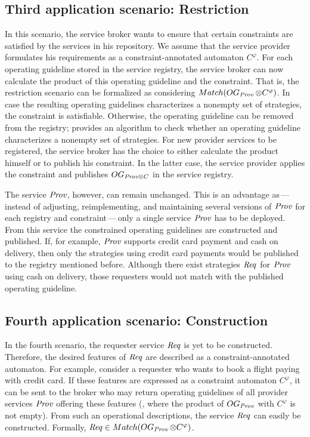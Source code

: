 \subsection*{Third application scenario: Restriction}

In this scenario, the service broker wants to ensure that certain constraints are satisfied by the services in his repository. We assume that the service provider formulates his requirements as a constraint-annotated automaton $C^{\varphi}$. For each operating guideline stored in the service registry, the service broker can now calculate the product of this operating guideline and the constraint. That is, the restriction scenario can be formalized as considering $\mathop{Match}(\mathop{OG}_{\mathit{Prov}}\otimes C^{\varphi})$. In case the resulting operating guidelines characterizes a nonempty set of strategies, the constraint is satisfiable. Otherwise, the operating guideline can be removed from the registry; \citet{Massuthe_2009_phd} provides an algorithm to check whether an operating guideline characterizes a nonempty set of strategies. For new provider services to be registered, the service broker has the choice to either calculate the product himself or to publish his constraint. In the latter case, the service provider applies the constraint and publishes $\mathop{OG}_{\mathit{Prov} \otimes C}$ in the service registry.

The service $\mathit{Prov}$, however, can remain unchanged. This is an advantage as\,---\,in\-stead of adjusting, reimplementing, and maintaining several versions of $\mathit{Prov}$ for each registry and constraint\,---\,only a single service $\mathit{Prov}$ has to be deployed. From this service the constrained operating guidelines are constructed and published. If, for example, $\mathit{Prov}$ supports credit card payment and cash on delivery, then only the strategies using credit card payments would be published to the registry mentioned before. Although there exist strategies $\mathit{Req}$ for $\mathit{Prov}$ using cash on delivery, those requesters would not match with the published operating guideline.




\subsection*{Fourth application scenario: Construction}

In the fourth scenario, the requester service $\mathit{Req}$ is yet to be constructed. Therefore, the desired features of $\mathit{Req}$ are described as a constraint-annotated automaton. For example, consider a requester who wants to book a flight paying with credit card. If these features are expressed as a constraint automaton $C^\varphi$, it can be sent to the broker who may return operating guidelines of all provider services $\mathit{Prov}$ offering these features (\ie, where the product of $\mathop{OG}_{\mathit{Prov}}$ with $C^\varphi$ is not empty). From such an operational descriptions, the service $\mathit{Req}$ can easily be constructed. Formally, $\mathit{Req}\in\mathop{Match}(\mathop{OG}_{\mathit{Prov}}\otimes C^{\varphi})$.

